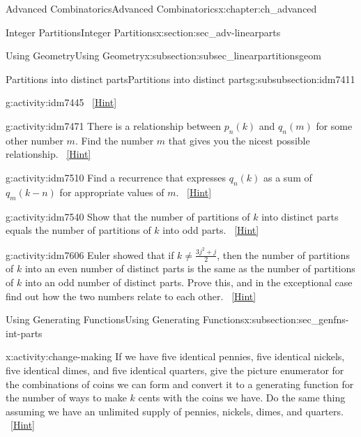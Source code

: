 \documentclass[oneside,10pt,]{book}
\numberwithin{equation}{chapter}
\begin{document}
\begin{chapterptx}{Advanced Combinatorics}{}{Advanced Combinatorics}{}{}{x:chapter:ch_advanced}
\begin{sectionptx}{Integer Partitions}{}{Integer Partitions}{}{}{x:section:sec_adv-linearparts}
\begin{subsectionptx}{Using Geometry}{}{Using Geometry}{}{}{x:subsection:subsec_linearpartitionsgeom}
\begin{subsubsectionptx}{Partitions into distinct parts}{}{Partitions into distinct parts}{}{}{g:subsubsection:idm7411}
\begin{activity}{}{g:activity:idm7445}
\qquad~\hfill{\tiny\hyperlink{g:hint:idm7448-back}{[Hint]}}\end{activity}
\begin{activity}{}{g:activity:idm7471}%
There is a relationship between \(p_n(k)\) and \(q_n(m)\) for some other number \(m\). Find the number \(m\) that gives you the nicest possible relationship.%
\qquad~\hfill{\tiny\hyperlink{g:hint:idm7478-back}{[Hint]}}\end{activity}
\begin{activity}{}{g:activity:idm7510}%
Find a recurrence that expresses \(q_n(k)\) as a sum of \(q_m(k-n)\) for appropriate values of \(m\).%
\qquad~\hfill{\tiny\hyperlink{g:hint:idm7516-back}{[Hint]}}\end{activity}
\begin{activity}{}{g:activity:idm7540}%
Show that the number of partitions of \(k\) into distinct parts equals the number of partitions of \(k\) into odd parts.%
\qquad~\hfill{\tiny\hyperlink{g:hint:idm7545-back}{[Hint]}}\end{activity}
\begin{activity}{}{g:activity:idm7606}%
Euler showed that if \(k\not= \frac{3j^2+j}{2}\), then the number of partitions of \(k\) into an even number of distinct parts is the same as the number of partitions of \(k\) into an odd number of distinct parts. Prove this, and in the exceptional case find out how the two numbers relate to each other.%
\qquad~\hfill{\tiny\hyperlink{g:hint:idm7612-back}{[Hint]}}\end{activity}
\end{subsubsectionptx}
\end{subsectionptx}
%
%
\typeout{************************************************}
\typeout{************************************************}
%
\begin{subsectionptx}{Using Generating Functions}{}{Using Generating Functions}{}{}{x:subsection:sec_genfns-int-parts}
\begin{activity}{}{x:activity:change-making}%
If we have five identical pennies, five identical nickels, five identical dimes, and five identical quarters, give the picture enumerator for the combinations of coins we can form and convert it to a generating function for the number of ways to make \(k\) cents with the coins we have. Do the same thing assuming we have an unlimited supply of pennies, nickels, dimes, and quarters.%
\qquad~\hfill{\tiny\hyperlink{g:hint:idm7670-back}{[Hint]}}\end{activity}

\end{subsectionptx}
\end{sectionptx}
\end{chapterptx}
\end{document}
